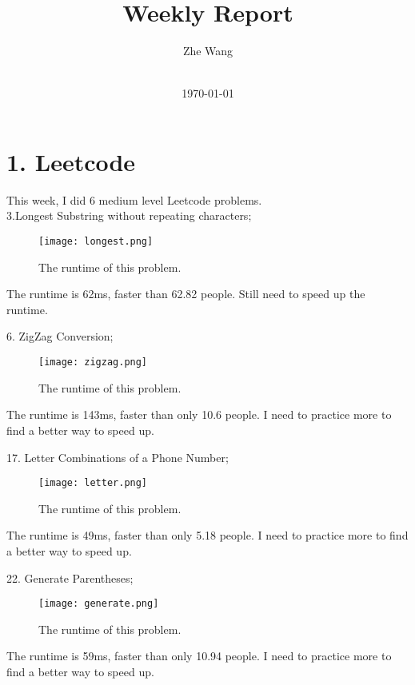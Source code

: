 \documentclass[a4paper]{article}
\title{
    \vspace*{1in}
    \vspace*{1.2in}
    \textbf{\huge Weekly Report}
    \vspace{0.2in}
}
\author{Zhe Wang \\
    \vspace*{0.5in} \\
    \vspace*{1in}
}
\date{\today}
\begin{document}
\maketitle
\setcounter{page}{0}
\thispagestyle{empty}
\newpage
\section{1. Leetcode}

This week, I did 6 medium level Leetcode problems. \\
3.Longest Substring without repeating characters; 

\begin{figure}[H]
\begin{center}
\texttt{[image: longest.png]}
\end{center}
\caption{The runtime of this problem.}
\label{fig1}
\end{figure}
The runtime is 62ms, faster than 62.82 people. Still need to speed up the runtime. 

6. ZigZag Conversion; \\
\begin{figure}[H]
\begin{center}
\texttt{[image: zigzag.png]}
\end{center}
\caption{The runtime of this problem.}
\label{fig2}
\end{figure}
The runtime is 143ms, faster than only 10.6 people. I need to practice more to find a better way to speed up. 

17. Letter Combinations of a Phone Number; \\
\begin{figure}[H]
\begin{center}
\texttt{[image: letter.png]}
\end{center}
\caption{The runtime of this problem.}
\label{fig3}
\end{figure}
The runtime is 49ms, faster than only 5.18 people. I need to practice more to find a better way to speed up. 


22. Generate Parentheses; \\
\begin{figure}[H]
\begin{center}
\texttt{[image: generate.png]}
\end{center}
\caption{The runtime of this problem.}
\label{fig4}
\end{figure}
The runtime is 59ms, faster than only 10.94 people. I need to practice more to find a better way to speed up. 
\end{document}
